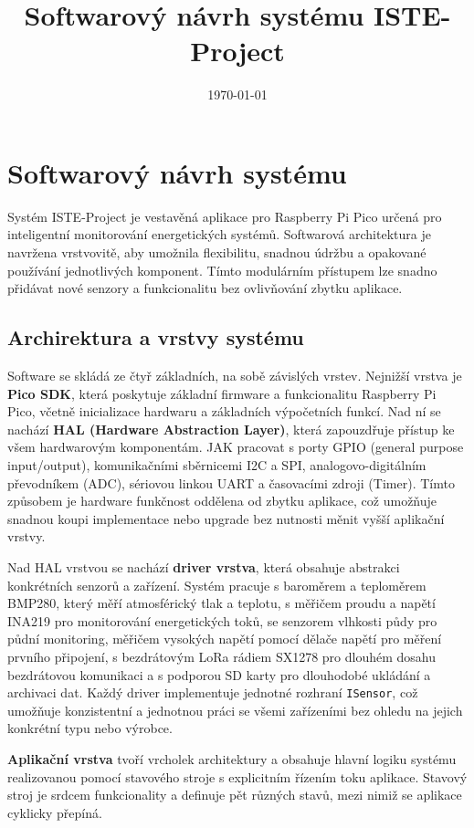 \documentclass[12pt,a4paper]{article}
\title{Softwarový návrh systému ISTE-Project}
\author{}
\date{\today}
\begin{document}
\maketitle

\section{Softwarový návrh systému}

Systém ISTE-Project je vestavěná aplikace pro Raspberry Pi Pico určená pro inteligentní monitorování energetických systémů. Softwarová architektura je navržena vrstvovitě, aby umožnila flexibilitu, snadnou údržbu a opakované používání jednotlivých komponent. Tímto modulárním přístupem lze snadno přidávat nové senzory a funkcionalitu bez ovlivňování zbytku aplikace.

\subsection*{Archirektura a vrstvy systému}

Software se skládá ze čtyř základních, na sobě závislých vrstev. Nejnižší vrstva je \textbf{Pico SDK}, která poskytuje základní firmware a funkcionalitu Raspberry Pi Pico, včetně inicializace hardwaru a základních výpočetních funkcí. Nad ní se nachází \textbf{HAL (Hardware Abstraction Layer)}, která zapouzdřuje přístup ke všem hardwarovým komponentám. JAK pracovat s porty GPIO (general purpose input/output), komunikačními sběrnicemi I2C a SPI, analogovo-digitálním převodníkem (ADC), sériovou linkou UART a časovacími zdroji (Timer). Tímto způsobem je hardware funkčnost oddělena od zbytku aplikace, což umožňuje snadnou koupi implementace nebo upgrade bez nutnosti měnit vyšší aplikační vrstvy.

Nad HAL vrstvou se nachází \textbf{driver vrstva}, která obsahuje abstrakci konkrétních senzorů a zařízení. Systém pracuje s baroměrem a teploměrem BMP280, který měří atmosférický tlak a teplotu, s měřičem proudu a napětí INA219 pro monitorování energetických toků, se senzorem vlhkosti půdy pro půdní monitoring, měřičem vysokých napětí pomocí dělače napětí pro měření prvního připojení, s bezdrátovým LoRa rádiem SX1278 pro dlouhém dosahu bezdrátovou komunikaci a s podporou SD karty pro dlouhodobé ukládání a archivaci dat. Každý driver implementuje jednotné rozhraní \texttt{ISensor}, což umožňuje konzistentní a jednotnou práci se všemi zařízeními bez ohledu na jejich konkrétní typu nebo výrobce.

\textbf{Aplikační vrstva} tvoří vrcholek architektury a obsahuje hlavní logiku systému realizovanou pomocí stavového stroje s explicitním řízením toku aplikace. Stavový stroj je srdcem funkcionality a definuje pět různých stavů, mezi nimiž se aplikace cyklicky přepíná.
\end{document}
